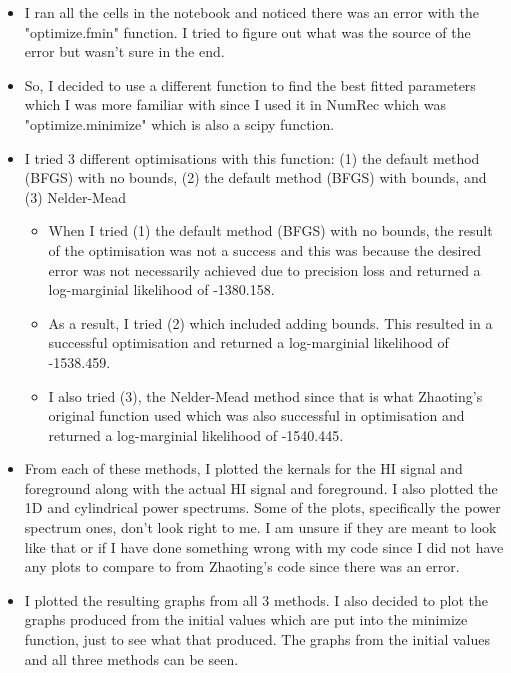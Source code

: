 \begin{itemize}
    \item I ran all the cells in the notebook and noticed there was an error with the "optimize.fmin" function. I tried to figure out what was the source of the error but wasn't sure in the end.
    \item So, I decided to use a different function to find the best fitted parameters which I was more familiar with since I used it in NumRec which was "optimize.minimize" which is also a scipy function.
    \item I tried 3 different optimisations with this function: (1) the default method (BFGS) with no bounds, (2) the default method (BFGS) with bounds, and (3) Nelder-Mead
    \begin{itemize}
        \item When I tried (1) the default method (BFGS) with no bounds, the result of the optimisation was not a success and this was because the desired error was not necessarily achieved due to precision loss and returned a log-marginial likelihood of -1380.158.
    \end{itemize}
    \begin{itemize}
        \item As a result, I tried (2) which included adding bounds. This resulted in a successful optimisation and returned a log-marginial likelihood of -1538.459. 
        \item I also tried (3), the Nelder-Mead method since that is what Zhaoting's original function used which was also successful in optimisation and returned a log-marginial likelihood of -1540.445.
    \end{itemize}
\item From each of these methods, I plotted the kernals for the HI signal and foreground along with the actual HI signal and foreground. I also plotted the 1D and cylindrical power spectrums. Some of the plots, specifically the power spectrum ones, don't look right to me. I am unsure if they are meant to look like that or if I have done something wrong with my code since I did not have any plots to compare to from Zhaoting's code since there was an error.
\item I plotted the resulting graphs from all 3 methods. I also decided to plot the graphs produced from the initial values which are put into the minimize function, just to see what that produced. The graphs from the initial values and all three methods can be seen.
\end{itemize}

